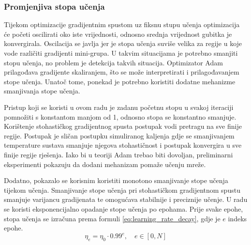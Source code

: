 \documentclass[times, utf8, numeric, diplomski]{fer}
\def\TODO#1{\noindent\textcolor{red}{TODO: \textit{#1}}\newline}
\def\todo#1{\TODO{#1}}
\begin{document}
\subsubsection{Promjenjiva stopa učenja}
Tijekom optimizacije gradijentnim spustom uz fiksnu stupu učenja optimizacija će početi oscilirati oko iste vrijednosti, odnosno srednja vrijednost gubitka je konvergirala. Oscilacija se javlja jer je stopa učenja suviše velika za regije u koje vode različiti gradijenti mini-grupa. U takvim situacijama je potrebno smanjiti stopu učenja, no problem je detekcija takvih situacija. Optimizator Adam prilagođava gradijente skaliranjem, što se može interpretirati i prilagođavanjem stope učenja. Unatoč tome, ponekad je potrebno koristiti dodatne mehanizme smanjivanja stope učenja.



Pristup koji se koristi u ovom radu je zadanu početnu stopu u svakoj iteraciji pomnožiti s konstantom manjom od 1, odnosno stopa se konstantno smanjuje. Korištenje stohastičkog gradijentnog spusta postupak vodi pretragu na sve finije regije. Postupak je sličan postupku simuliranog kaljenja gdje se smanjivanjem temperature sustava smanjuje njegova stohastičnost i postupak konvergira u sve finije regije rješenja. Iako bi u teoriji Adam trebao biti dovoljan, preliminarni eksperimenti pokazuju da dodani mehanizam pomaže učenju mreže.

Dodatno, pokazalo se korisnim koristiti monotono smanjivanje stope učenja tijekom učenja. Smanjivanje stope učenja pri stohastičkom gradijentnom spustu smanjuje varijancu gradijenata te omogućava stabilnije i preciznije učenje. U radu se koristi eksponencijalno opadanje stope učenja po epohama. Prije svake epohe, stopa učenja se izračuna prema formuli \eqref{eq:learning_rate_decay}, gdje je $e$ indeks epohe.
\begin{equation}
\label{eq:learning_rate_decay}
\eta_e = \eta_0 \cdot 0.99^e,\quad e \in [0, N]
\end{equation}
\end{document}
